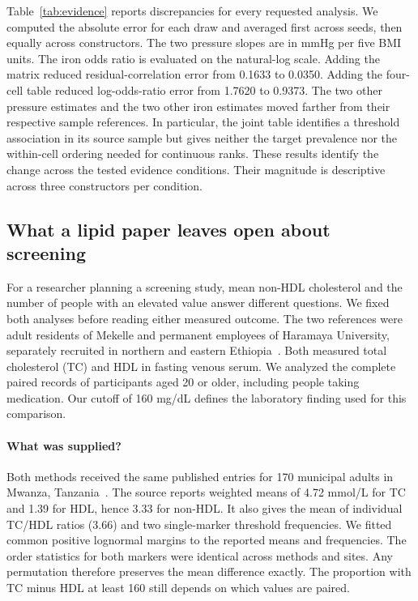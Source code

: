 \documentclass[sigconf,anonymous,review]{acmart}
\begin{document}
Table~\ref{tab:evidence} reports discrepancies for every requested analysis. We computed the absolute error for each draw and averaged first across seeds, then equally across constructors. The two pressure slopes are in mmHg per five BMI units. The iron odds ratio is evaluated on the natural-log scale. Adding the matrix reduced residual-correlation error from 0.1633 to 0.0350. Adding the four-cell table reduced log-odds-ratio error from 1.7620 to 0.9373. The two other pressure estimates and the two other iron estimates moved farther from their respective sample references. In particular, the joint table identifies a threshold association in its source sample but gives neither the target prevalence nor the within-cell ordering needed for continuous ranks. These results identify the change across the tested evidence conditions. Their magnitude is descriptive across three constructors per condition.

\subsection{What a lipid paper leaves open about screening}
\label{sec:nonhdl}
For a researcher planning a screening study, mean non-HDL cholesterol and the number of people with an elevated value answer different questions. We fixed both analyses before reading either measured outcome. The two references were adult residents of Mekelle and permanent employees of Haramaya University, separately recruited in northern and eastern Ethiopia~\cite{mekelle,haramaya}. Both measured total cholesterol (TC) and HDL in fasting venous serum. We analyzed the complete paired records of participants aged 20 or older, including people taking medication. Our cutoff of 160 mg/dL defines the laboratory finding used for this comparison.

\paragraph{What was supplied?}
Both methods received the same published entries for 170 municipal adults in Mwanza, Tanzania~\cite{kavishe}. The source reports weighted means of 4.72 mmol/L for TC and 1.39 for HDL, hence 3.33 for non-HDL. It also gives the mean of individual TC/HDL ratios (3.66) and two single-marker threshold frequencies. We fitted common positive lognormal margins to the reported means and frequencies. The order statistics for both markers were identical across methods and sites. Any permutation therefore preserves the mean difference exactly. The proportion with TC minus HDL at least 160 still depends on which values are paired.
\end{document}
